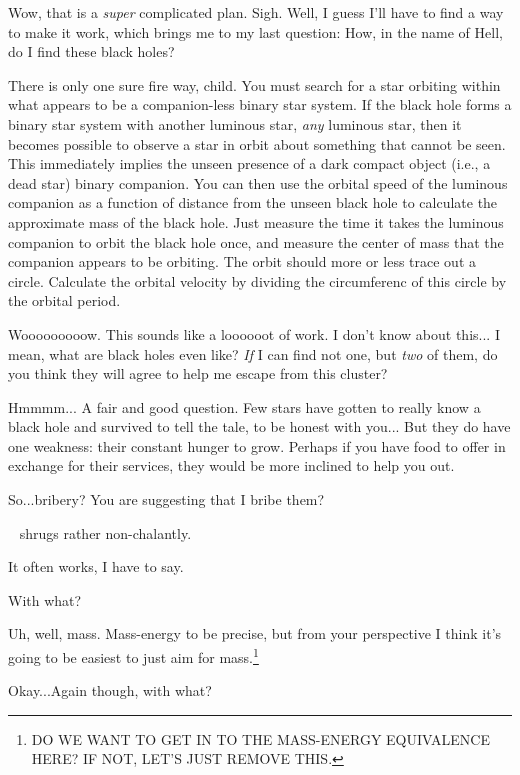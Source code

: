 \documentclass[main.tex]{subfiles}
\begin{document}
\newpara \Sterope Wow, that is a \textit{super} complicated plan.  Sigh.  Well, I guess I'll have to find a way to make it work, which brings me to my last question:  How, in the name of Hell, do I find these black holes?

\newpara \Enrico There is only one sure fire way, child.  You must search for a star orbiting within what appears to be a companion-less binary star system.  If the black hole forms a binary star system with another luminous star, \textit{any} luminous star, then it becomes possible to observe a star in orbit about something that cannot be seen.  This immediately implies the unseen presence of a dark compact object (i.e., a dead star) binary companion.  You can then use the orbital speed of the luminous companion as a function of distance from the unseen black hole to calculate the approximate mass of the black hole.  Just measure the time it takes the luminous companion to orbit the black hole once, and measure the center of mass that the companion appears to be orbiting.  The orbit should more or less trace out a circle.  Calculate the orbital velocity by dividing the circumferenc of this circle by the orbital period.

\newpara \Sterope Wooooooooow.  This sounds like a loooooot of work.  I don't know about this... I mean, what are black holes even like?  \textit{If} I can find not one, but \textit{two} of them, do you think they will agree to help me escape from this cluster?

\newpara \Enrico Hmmmm... A fair and good question.  Few stars have gotten to really know a black hole and survived to tell the tale, to be honest with you... But they do have one weakness:  their constant hunger to grow.  Perhaps if you have food to offer in exchange for their services, they would be more inclined to help you out.  

\newpara \Sterope  So...bribery?  You are suggesting that I bribe them?  

\newpara \nar \rmenrico~ shrugs rather non-chalantly.

\newpara \Enrico It often works, I have to say.

\newpara \Sterope With what?

\newpara \Enrico Uh, well, mass.  Mass-energy to be precise, but from your perspective I think it's going to be easiest to just aim for mass.\footnote{DO WE WANT TO GET IN TO THE MASS-ENERGY EQUIVALENCE HERE?  IF NOT, LET'S JUST REMOVE THIS.}

\newpara \Sterope Okay...Again though, with what?
\end{document}
